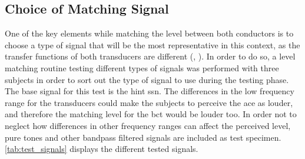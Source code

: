 \subsection{Choice of Matching Signal}
\label{sec:match_sig_cho}
One of the key elements while matching the level between both conductors is to choose a type of signal that will be the most representative in this context, as the transfer functions of both transducers are different (\citep{microPro_er4},  \citep{radioear_b81}). In order to do so, a level matching routine testing different types of signals was performed with three subjects in order to sort out the type of signal to use during the testing phase. The base signal for this test is the \matlab \gls{hint} \gls{ssn}. The differences in the low frequency range for the transducers could make the subjects to perceive the \gls{ace} as louder, and therefore the matching level for the \gls{bct} would be louder too. In order not to neglect how differences in other frequency ranges can affect the perceived level, pure tones and other bandpass filtered signals are included as test specimen. \autoref{tab:test_signals} displays the different tested signals.
